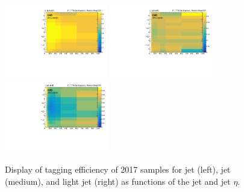 \begin{figure}\centering
    \includegraphics[width=0.4\textwidth]{figure/BtagEffPlot_17_TTToSemiLeptonic_eff2D_b_MediumDeepCSV.pdf}
    \includegraphics[width=0.4\textwidth]{figure/BtagEffPlot_17_TTToSemiLeptonic_eff2D_c_MediumDeepCSV.pdf}
    \includegraphics[width=0.4\textwidth]{figure/BtagEffPlot_17_TTToSemiLeptonic_eff2D_l_MediumDeepCSV.pdf}
    \caption[Display of \PQb tagging efficiency of 2017 \ttbar samples.]
    {
        Display of \PQb tagging efficiency of 2017 \ttbar samples for \PQb jet (left), \PQc jet (medium), and light jet (right) as functions of the jet \PT and jet $\eta$.
    }
    \label{fig:reco_beff17}
\end{figure}
